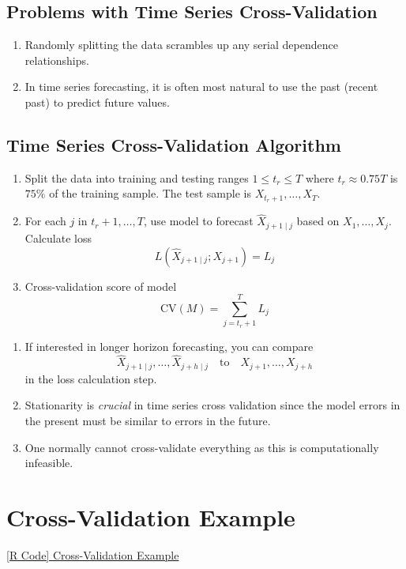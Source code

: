 \subsection*{Problems with Time Series Cross-Validation}
\begin{enumerate}[(1)]
      \item Randomly splitting the data scrambles up any serial dependence relationships.
      \item In time series forecasting, it is often most natural to use
            the past (recent past) to predict future values.
\end{enumerate}
\subsection*{Time Series Cross-Validation Algorithm}
\begin{enumerate}[(1)]
      \item Split the data into training and testing ranges $ 1\le t_r\le T $
            where $ t_r\approx 0.75T $ is $ 75\% $ of the training sample.
            The test sample is $ X_{t_r+1},\ldots,X_T $.
      \item For each $ j $ in $ t_r+1,\ldots,T $, use model to forecast
            $ \hat{X}_{j+1\mid j} $ based on $ X_1,\ldots,X_j $. Calculate loss
            \[ L(\hat{X}_{j+1\mid j};X_{j+1})=L_j \]
      \item Cross-validation score of model
            \[ \text{CV}(M)=\sum_{j=t_r+1}^{T} L_j \]
\end{enumerate}
\begin{Remark}{}{}
      \begin{enumerate}[(1)]
            \item If interested in longer horizon forecasting, you can compare
                  \[ \hat{X}_{j+1\mid j},\ldots,\hat{X}_{j+h\mid j}\quad\text{to}\quad X_{j+1},\ldots,X_{j+h} \]
                  in the loss calculation step.
            \item Stationarity is \emph{crucial} in time series cross validation
                  since the model errors in the present must be similar to errors in the future.
            \item One normally cannot cross-validate everything as this is computationally
                  infeasible.
      \end{enumerate}
\end{Remark}
\section{Cross-Validation Example}
\href{https://github.com/Hextical/university-notes/blob/master/year-3/semester-2/STAT%20443/code/6.4%20-%20Cross-Validation%20Example.R}{[R Code] Cross-Validation Example} %
